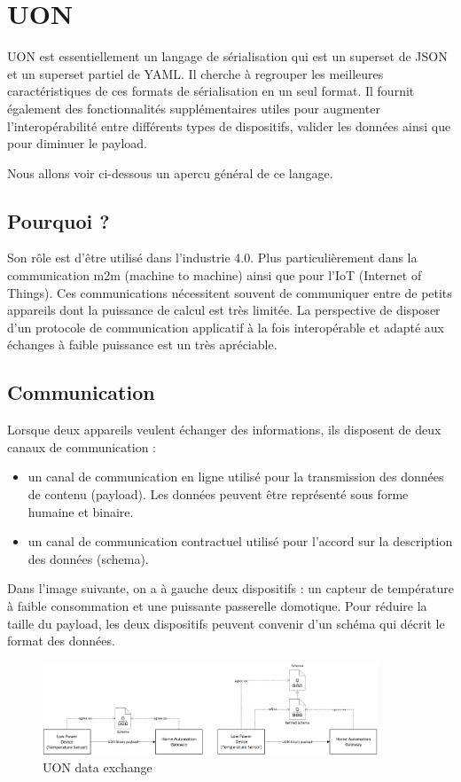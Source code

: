 \documentclass[
    iict, %
    il, %
]{heig-tb}
\begin{document}
\section{UON}
UON est essentiellement un langage de sérialisation qui est un superset de JSON et un superset partiel de YAML.
Il cherche à regrouper les meilleures caractéristiques de ces formats de sérialisation en un seul format.
Il fournit également des fonctionnalités supplémentaires utiles pour augmenter l'interopérabilité entre différents types de dispositifs, valider les données ainsi que pour diminuer le payload.

Nous allons voir ci-dessous un apercu général de ce langage.

\subsection{Pourquoi ?}
Son rôle est d'être utilisé dans l'industrie 4.0. Plus particulièrement dans la communication m2m (machine to machine) ainsi que pour l'IoT (Internet of Things).
Ces communications nécessitent souvent de communiquer entre de petits appareils dont la puissance de calcul est très limitée.
La perspective de disposer d'un protocole de communication applicatif à la fois interopérable et adapté aux échanges à faible puissance est un très apréciable.

\subsection{Communication}
Lorsque deux appareils veulent échanger des informations, ils disposent de deux canaux de communication :
\begin{itemize}
    \item un canal de communication en ligne utilisé pour la transmission des données de contenu (payload). Les données peuvent être représenté sous forme humaine et binaire.
    \item un canal de communication contractuel utilisé pour l'accord sur la description des données (schema).
\end{itemize}

Dans l'image suivante, on a à gauche deux dispositifs : un capteur de température à faible consommation
et une puissante passerelle domotique. Pour réduire la taille du payload, les deux dispositifs peuvent convenir d'un schéma qui décrit le format des données.

\begin{figure}[!ht]
    \begin{center}
        \includegraphics[width=10cm]{assets/figures/data-exchange.png}
    \end{center}
    \caption[UON data exchange]{\label{data-exchange}UON data exchange}
\end{figure}
\end{document}

